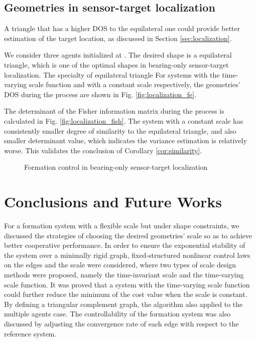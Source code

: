 \documentclass[times]{rncauth}
\begin{document}
\subsection{Geometries in sensor-target localization}
A triangle that has a higher DOS to the equilateral
one could provide better estimation of the target location, as
discussed in Section \ref{sec:localization}.

We consider three agents initialized at
. The desired shape is a equilateral
triangle, which is one of the optimal shapes in bearing-only
sensor-target localization. The specialty of equilateral triangle  For systems with the time-varying scale
function and with a constant scale respectively, the geometries'
DOS during the process are shown in Fig.
\ref{fig:localization_fe}.

The determinant of the Fisher information matrix during the process
is calculated in Fig. \ref{fig:localization_fish}. The system with a
constant scale has consistently smaller degree of
similarity to the equilateral triangle, and also smaller determinant
value, which indicates the variance estimation is relatively worse.
This validates the conclusion of Corollary \ref{cor:similarity}.
\begin{figure}
\caption{Formation control in bearing-only sensor-target
localization}
\end{figure}



\section{Conclusions and Future Works}
For a formation system with a flexible scale but under shape
constraints, we discussed the strategies of choosing the desired
geometries' scale so as to achieve better cooperative performance.
In order to ensure the exponential stability of the system over a minimally rigid graph,
fixed-structured nonlinear control laws on the edges and the scale were considered, where two
types of scale design methods were proposed, namely  the
time-invariant scale and the time-varying scale function.  It was
proved that a system with the time-varying scale function could
further reduce the minimum of the cost value when the scale is
constant. By defining a triangular complement graph, the algorithm
also applied to the multiple agents case. The controllability of the
formation system was also discussed by adjusting the convergence
rate of each edge with respect to the reference system.
\end{document}
